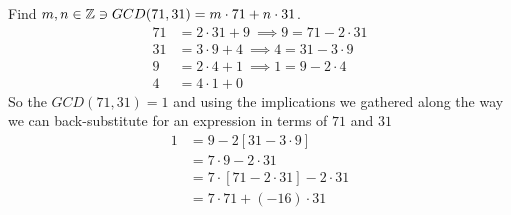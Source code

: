\begin{example}
Find $m,n\in {\mathbb{ Z}} \ni GCD(71,31)=m\cdot 71+n\cdot 31$.\steezybreak\\
\begin{align}
    71&= 2\cdot 31+9 \ \implies 9=71-2\cdot 31 \nonumber\\
    31&= 3\cdot 9+4 \ \implies 4=31-3\cdot 9\nonumber\\
    9&= 2\cdot 4+1 \ \implies 1=9-2\cdot 4\nonumber\\
    4&= 4\cdot 1+0 \nonumber
\end{align}
So the $GCD(71,31)=1$ and using the implications we gathered along the way we can back-substitute for an expression in terms of $71$ and $31$
\begin{align}
    1&=9-2[31-3\cdot 9]\nonumber \\
    &=7\cdot 9- 2\cdot 31\nonumber \\
    &=7\cdot [71-2\cdot 31]- 2\cdot 31\nonumber \\
    &=7\cdot 71+ (-16)\cdot 31\nonumber 
\end{align}
\end{example}
\newpage
